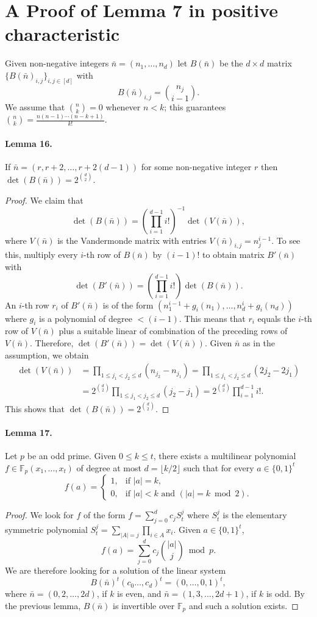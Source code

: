 \documentclass[10pt,a4paper]{article}
\begin{document}
\section*{A Proof of Lemma 7 in positive characteristic}
Given non-negative integers $\bar n=(n_1,\ldots,n_d)$ let $B(\bar n)$ be the $d\times d$ matrix $\{B(\bar n)_{i,j}\}_{i,j\in[d]}$ with
\[B(\bar n)_{i,j}=\binom{n_j}{i-1}.\]
We assume that $\binom nk=0$ whenever $n<k$; this guarantees $\binom nk=\frac{n(n-1)\cdots(n-k+1)}{k!}$.
\paragraph{Lemma 16.} If $\bar n=(r,r+2,\ldots,r+2(d-1))$ for some non-negative integer $r$ then $\det(B(\bar n))=2^{\binom d2}$.
\begin{proof}
We claim that
\[\det(B(\bar n))=\left(\prod_{i=1}^{d-1}i!\right)^{-1}\det(V(\bar n)),\]
where $V(\bar n)$ is the Vandermonde matrix with entries $V(\bar n)_{i,j}=n_j^{i-1}$. To see this, multiply every $i$-th row of $B(\bar n)$ by $(i-1)!$ to obtain matrix $B'(\bar n)$ with
\[\det(B'(\bar n))=\left(\prod_{i=1}^{d-1}i!\right)\det(B(\bar n)).\]
An $i$-th row $r_i$ of $B'(\bar n)$ is of the form $(n_1^{i-1}+g_i(n_1),\ldots,n_d^i+g_i(n_d))$ where $g_i$ is a polynomial of degree $<(i-1)$. This means that $r_i$ equals the $i$-th row of $V(\bar n)$ plus a suitable linear of combination of the preceding rows of $V(\bar n)$. Therefore, $\det(B'(\bar n))=\det(V(\bar n))$.
Given $\bar n$ as in the assumption, we obtain
\begin{align*}
\det(V(\bar n))&=\prod_{1\le j_1<j_2\le d}(n_{j_2}-n_{j_1})=\prod_{1\le j_1<j_2\le d}(2j_2-2j_1)\\
&=2^{\binom d2}\prod_{1\le j_1<j_2\le d}(j_2-j_1)=2^{\binom d2}\prod_{i=1}^{d-1}i!.
\end{align*}
This shows that $\det(B(\bar n))=2^{\binom d2}$.
\end{proof}
\paragraph{Lemma 17.} Let $p$ be an odd prime. Given $0\le k\le t$, there exists a multilinear polynomial $f\in\mathbb F_p(x_1,\ldots,x_t)$ of degree at most $d=\lfloor k/2\rfloor$ such that for every $a\in\{0,1\}^t$
\[f(a)=\begin{cases}1,&\text{if }|a|=k,\\0,&\text{if }|a|<k\text{ and }(|a|=k\bmod2).\end{cases}\]
\begin{proof}
We look for $f$ of the form $f=\sum_{j=0}^d c_j S_t^j$ where $S_t^j$ is the elementary symmetric polynomial $S_t^j=\sum_{|A|=j}\prod_{i\in A}x_i$. Given $a\in\{0,1\}^t$,
\[f(a)=\sum_{j=0}^d c_j\binom{|a|}j\bmod p.\]
We are therefore looking for a solution of the linear system
\[B(\bar n)^t(c_0\ldots,c_d)^t=(0,\ldots,0,1)^t,\]
where $\bar n=(0,2,\ldots,2d)$, if $k$ is even, and $\bar n=(1,3,\ldots,2d+1)$, if $k$ is odd. By the previous lemma, $B(\bar n)$ is invertible over $\mathbb F_p$ and such a solution exists.
\end{proof}
\end{document}
